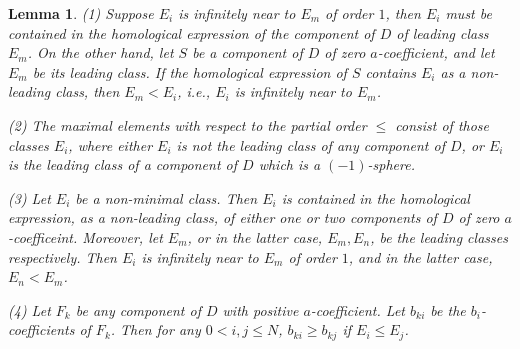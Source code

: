 \documentclass[11pt]{amsart}
\theoremstyle{plain}
\numberwithin{theorem}{section}
\newtheorem{lemma}[theorem]{Lemma}
\theoremstyle{definition}
\begin{document}
\begin{lemma}
{\em (1)} Suppose $E_i$ is infinitely near to $E_m$ of order $1$, then $E_i$ must be contained in the homological expression of the component of $D$ of leading class $E_m$. On the other hand, 
let $S$ be a component of $D$ of zero $a$-coefficient, and let $E_m$ be its leading class. 
If the homological expression of $S$ contains $E_i$ as a non-leading class, then $E_m<E_i$, i.e., $E_i$ is infinitely near to $E_m$. 

{\em (2)} The maximal elements with respect to the partial order $\leq$ consist of those classes $E_i$,
where either $E_i$ is not the leading class of any component of $D$, or $E_i$ is the leading class 
of a component of $D$ which is a $(-1)$-sphere. 

{\em (3)} Let $E_i$ be a non-minimal class. Then $E_i$ is contained in the homological expression, as a non-leading class, of either one or two components of $D$ of zero $a$-coefficeint. Moreover, let $E_m$, or in the latter case, $E_m, E_n$, be the leading classes respectively. Then $E_i$ is infinitely near to $E_m$ of order $1$, and in the latter case, $E_n<E_m$.

{\em (4)} Let $F_k$ be any component of $D$ with positive $a$-coefficient. Let $b_{ki}$ be the $b_i$-coefficients of $F_k$. Then for any $0<i,j\leq N$, $b_{ki}\geq b_{kj}$ if $E_i\leq E_j$.
\end{lemma}
\end{document}
